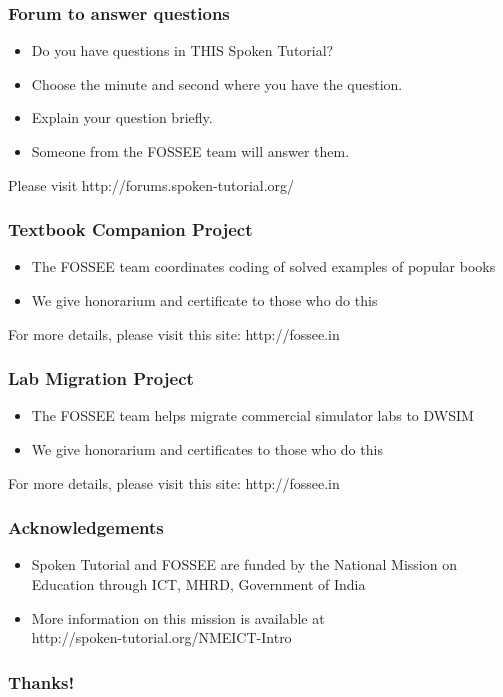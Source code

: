 \documentclass[17pt,xcolor=table]{beamer}
\begin{document}
\begin{frame}
\frametitle{Forum to answer questions}
\vspace{-0.5in}
\begin{itemize}
\item Do you have questions in THIS Spoken Tutorial?
\item Choose the minute and second where you have the question.
\item Explain your question briefly.
\item Someone from the FOSSEE team will answer them.
\end{itemize}
Please visit {\small \color{blue}
  http://forums.spoken-tutorial.org/} 
\end{frame}

\begin{frame}
\frametitle{Textbook Companion Project}
\begin{itemize}
\item The FOSSEE team coordinates coding of solved examples of popular
  books 
\item We give honorarium and certificate to those who do this
\end{itemize}
For more details, please visit this site: 
{\color{blue} http://fossee.in}
\end{frame}

\begin{frame}
\frametitle{Lab Migration Project}
\begin{itemize}
\item The FOSSEE team helps migrate commercial simulator labs to DWSIM
\item We give honorarium and certificates to those who do this
\end{itemize}
For more details, please visit this site: 
{\color{blue} http://fossee.in}
\end{frame}

\begin{frame}
\frametitle{Acknowledgements}
\begin{itemize}
\item Spoken Tutorial and FOSSEE are funded by the National Mission on
  Education through ICT, MHRD, Government of India
\item More information on this mission is available at \\
\hspace{0.25in}
{\small \color{blue}http://spoken-tutorial.org/NMEICT-Intro}
\end{itemize}
\end{frame}

\begin{frame}
\frametitle{Thanks!}
\end{frame}
\end{document}
